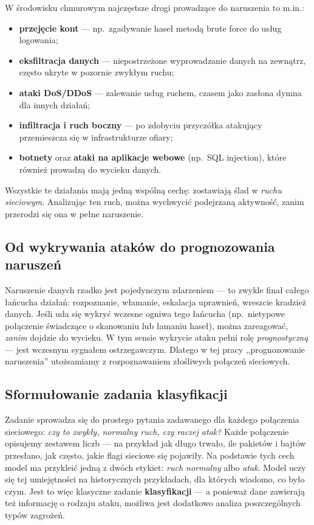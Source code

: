 W środowisku chmurowym najczęstsze drogi prowadzące do naruszenia to m.in.:
\begin{itemize}
  \item \textbf{przejęcie kont} --- np.\ zgadywanie haseł metodą brute force do
        usług logowania;
  \item \textbf{eksfiltracja danych} --- niepostrzeżone wyprowadzanie danych na
        zewnątrz, często ukryte w pozornie zwykłym ruchu;
  \item \textbf{ataki DoS/DDoS} --- zalewanie usług ruchem, czasem jako zasłona
        dymna dla innych działań;
  \item \textbf{infiltracja i ruch boczny} --- po zdobyciu przyczółka atakujący
        przemieszcza się w infrastrukturze ofiary;
  \item \textbf{botnety} oraz \textbf{ataki na aplikacje webowe} (np.\ SQL
        injection), które również prowadzą do wycieku danych.
\end{itemize}

Wszystkie te działania mają jedną wspólną cechę: zostawiają ślad w \emph{ruchu
sieciowym}. Analizując ten ruch, można wychwycić podejrzaną aktywność, zanim
przerodzi się ona w pełne naruszenie.

\subsection{Od wykrywania ataków do prognozowania naruszeń}

Naruszenie danych rzadko jest pojedynczym zdarzeniem --- to zwykle finał całego
łańcucha działań: rozpoznanie, włamanie, eskalacja uprawnień, wreszcie kradzież
danych. Jeśli uda się wykryć wczesne ogniwa tego łańcucha (np.\ nietypowe
połączenie świadczące o skanowaniu lub łamaniu haseł), można zareagować, \emph{zanim}
dojdzie do wycieku. W tym sensie wykrycie ataku pełni rolę \emph{prognostyczną}
--- jest wczesnym sygnałem ostrzegawczym. Dlatego w tej pracy ,,prognozowanie
naruszenia'' utożsamiamy z rozpoznawaniem złośliwych połączeń sieciowych.

\subsection{Sformułowanie zadania klasyfikacji}

Zadanie sprowadza się do prostego pytania zadawanego dla każdego połączenia
sieciowego: \emph{czy to zwykły, normalny ruch, czy raczej atak?} Każde
połączenie opisujemy zestawem liczb --- na przykład jak długo trwało, ile
pakietów i bajtów przesłano, jak często, jakie flagi sieciowe się pojawiły.
Na podstawie tych cech model ma przykleić jedną z dwóch etykiet: \emph{ruch
normalny} albo \emph{atak}. Model uczy się tej umiejętności na historycznych
przykładach, dla których wiadomo, co było czym. Jest to więc klasyczne zadanie
\textbf{klasyfikacji} --- a ponieważ dane zawierają też informację o rodzaju
ataku, możliwa jest dodatkowo analiza poszczególnych typów zagrożeń.

